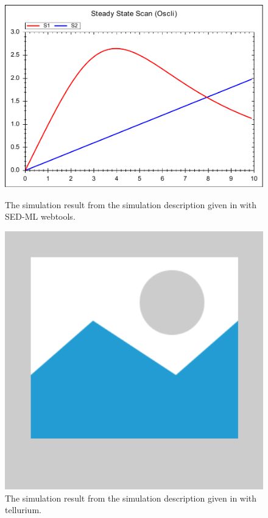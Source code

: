 \begin{figure}[ht]
    \centering
    \begin{minipage}{0.47\textwidth}
        \centering
        \includegraphics[width=1.0\textwidth]{examples/repeated-steady-scan-oscli/results/repeated-steady-scan-oscli}
        \caption{The simulation result from the simulation description given in  with SED-ML webtools.}
    \end{minipage}\hfill
    \begin{minipage}{0.47\textwidth}
        \centering
        \includegraphics[width=1.0\textwidth]{examples/placeholder}
        \caption{The simulation result from the simulation description given in  with tellurium.}
    \end{minipage}
    \label{fig:repeated-steady-scan-oscli}
\end{figure}

